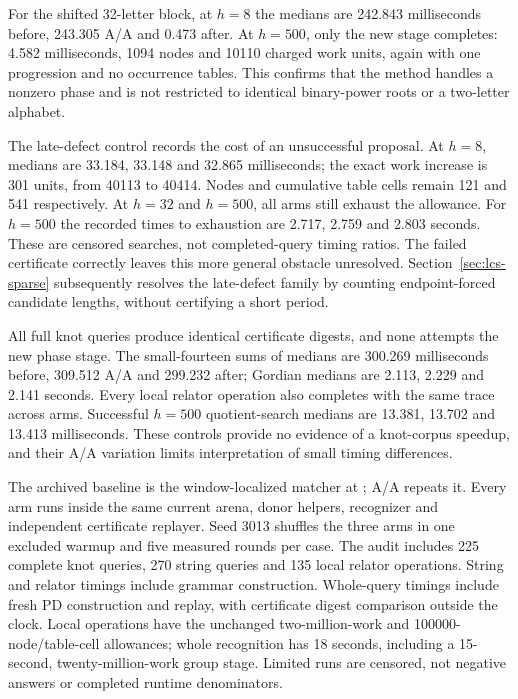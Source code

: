 For the shifted 32-letter block, at $h=8$ the medians are 242.843
milliseconds before, 243.305 A/A and 0.473 after. At $h=500$, only the
new stage completes: 4.582 milliseconds, 1094 nodes and 10110 charged
work units, again with one progression and no occurrence tables. This
confirms that the method handles a nonzero phase and is not restricted
to identical binary-power roots or a two-letter alphabet.

The late-defect control records the cost of an unsuccessful proposal.
At $h=8$, medians are 33.184, 33.148 and 32.865 milliseconds; the exact
work increase is 301 units, from 40113 to 40414. Nodes and cumulative
table cells remain 121 and 541 respectively. At $h=32$ and $h=500$,
all arms still exhaust the allowance. For $h=500$ the recorded times to
exhaustion are 2.717, 2.759 and 2.803 seconds. These are censored searches,
not completed-query timing ratios. The failed certificate correctly leaves
this more general obstacle unresolved.
Section~\ref{sec:lcs-sparse} subsequently resolves the late-defect family
by counting endpoint-forced candidate lengths, without certifying a short period.

All full knot queries produce identical certificate digests, and none
attempts the new phase stage. The small-fourteen sums of medians are
300.269 milliseconds before, 309.512 A/A and 299.232 after; Gordian
medians are 2.113, 2.229 and 2.141 seconds. Every local relator operation
also completes with the same trace across arms. Successful $h=500$
quotient-search medians are 13.381, 13.702 and 13.413 milliseconds.
These controls provide no evidence of a knot-corpus speedup, and their
A/A variation limits interpretation of small timing differences.

The archived baseline is the window-localized matcher at ;
A/A repeats it. Every arm runs inside the same current arena, donor helpers,
recognizer and independent certificate replayer. Seed 3013 shuffles the
three arms in one excluded warmup and five measured rounds per case.
The audit includes 225 complete knot queries, 270 string queries and 135
local relator operations. String and relator timings include grammar
construction. Whole-query timings include fresh PD construction and replay,
with certificate digest comparison outside the clock. Local operations
have the unchanged two-million-work and 100000-node/table-cell allowances;
whole recognition has 18 seconds, including a 15-second, twenty-million-work
group stage. Limited runs are censored, not negative answers or completed
runtime denominators.

